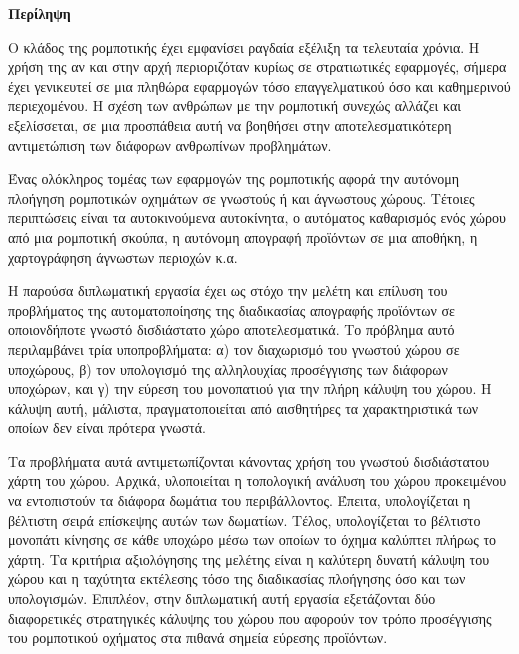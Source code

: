 \begin{center}
  \centering

  \vspace{0.5cm}
  \centering
  \textbf{\Large{Περίληψη}}

  \vspace{1cm}

\end{center}

Ο κλάδος της ρομποτικής έχει εμφανίσει ραγδαία εξέλιξη τα τελευταία χρόνια. Η χρήση της αν και στην αρχή περιοριζόταν κυρίως σε στρατιωτικές εφαρμογές, σήμερα έχει γενικευτεί σε μια πληθώρα εφαρμογών τόσο επαγγελματικού όσο και καθημερινού περιεχομένου. Η σχέση των ανθρώπων με την ρομποτική συνεχώς αλλάζει και εξελίσσεται, σε μια προσπάθεια αυτή να βοηθήσει στην αποτελεσματικότερη αντιμετώπιση των διάφορων ανθρωπίνων προβλημάτων.

Ένας ολόκληρος τομέας των εφαρμογών της ρομποτικής αφορά την αυτόνομη πλοήγηση ρομποτικών οχημάτων σε γνωστούς ή και άγνωστους χώρους. Τέτοιες περιπτώσεις είναι τα αυτοκινούμενα αυτοκίνητα, ο αυτόματος καθαρισμός ενός χώρου από μια ρομποτική σκούπα, η αυτόνομη απογραφή προϊόντων σε μια αποθήκη, η χαρτογράφηση άγνωστων περιοχών κ.α.

Η παρούσα διπλωματική εργασία έχει ως στόχο την μελέτη και επίλυση του προβλήματος της αυτοματοποίησης της διαδικασίας απογραφής προϊόντων σε οποιονδήποτε γνωστό δισδιάστατο χώρο αποτελεσματικά. Το πρόβλημα αυτό περιλαμβάνει τρία υποπροβλήματα: α) τον διαχωρισμό του γνωστού χώρου σε υποχώρους, β) τον υπολογισμό της αλληλουχίας προσέγγισης των διάφορων υποχώρων, και γ) την εύρεση του μονοπατιού για την πλήρη κάλυψη του χώρου. Η κάλυψη αυτή, μάλιστα, πραγματοποιείται από αισθητήρες τα χαρακτηριστικά των οποίων δεν είναι πρότερα γνωστά.

Τα προβλήματα αυτά αντιμετωπίζονται κάνοντας χρήση του γνωστού δισδιάστατου χάρτη του χώρου. Αρχικά, υλοποιείται η τοπολογική ανάλυση του χώρου προκειμένου να εντοπιστούν τα διάφορα δωμάτια του περιβάλλοντος. Έπειτα, υπολογίζεται η βέλτιστη σειρά επίσκεψης αυτών των δωματίων. Τέλος, υπολογίζεται το βέλτιστο μονοπάτι κίνησης σε κάθε υποχώρο μέσω των οποίων το όχημα καλύπτει πλήρως το χάρτη. Τα κριτήρια αξιολόγησης της μελέτης είναι η καλύτερη δυνατή κάλυψη του χώρου και η ταχύτητα εκτέλεσης τόσο της διαδικασίας πλοήγησης όσο και των υπολογισμών. Επιπλέον, στην διπλωματική αυτή εργασία εξετάζονται δύο διαφορετικές στρατηγικές κάλυψης του χώρου που αφορούν τον τρόπο προσέγγισης του ρομποτικού οχήματος στα πιθανά σημεία εύρεσης προϊόντων.

